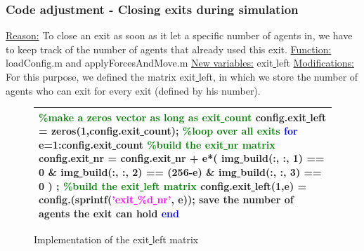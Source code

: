 \documentclass[11pt]{article}
\begin{document}
\subsubsection{Code adjustment - Closing exits during simulation}

\underline{Reason:}
\newline
To close an exit as soon as it let a specific number of agents in, we have to keep track of the number of agents that already used this exit.
\newline
\underline{Function:}
\newline
loadConfig.m and applyForcesAndMove.m
\newline
\underline{New variables:}
\newline 
exit\underline{ }left
\newline
\underline{Modifications:}
\newline
For this purpose, we defined the matrix exit\underline{ }left, in which we store the number of agents who can exit for every exit (defined by his number).

\begin{figure}[H]
\centering
\begin{tabular}
{|>{\large}m{\textwidth}|} \hline
\bigskip
\textcolor{green}{\%make a zeros vector as long as exit\underline{ }count}
\newline
config.exit\underline{ }left = zeros(1,config.exit\underline{ }count);
\newline
\textcolor{green}{\%loop over all exits}
\newline
\textcolor{blue}{for} e=1:config.exit\underline{ }count
\newline
\textcolor{green}{\%build the exit\underline{ }nr matrix}
\newline
config.exit\underline{ }nr = config.exit\underline{ }nr + e*( img\underline{ }build(:, :, 1) == 0 \& img\underline{ }build(:, :, 2) == (256-e) \& img\underline{ }build(:, :, 3) == 0 ) ;
\newline
\textcolor{green}{\%build the exit\underline{ }left matrix}
\newline
config.exit\underline{ }left(1,e) = config.(sprintf(\textcolor{magenta}{'exit\underline{ }\%d\underline{ }nr'}, e)); save the number of agents the exit can hold
\newline
\textcolor{blue}{end}
\bigskip
\\ \hline
\end{tabular}
\caption{Implementation of the exit\underline{ }left matrix}
\end{figure}
\end{document}
